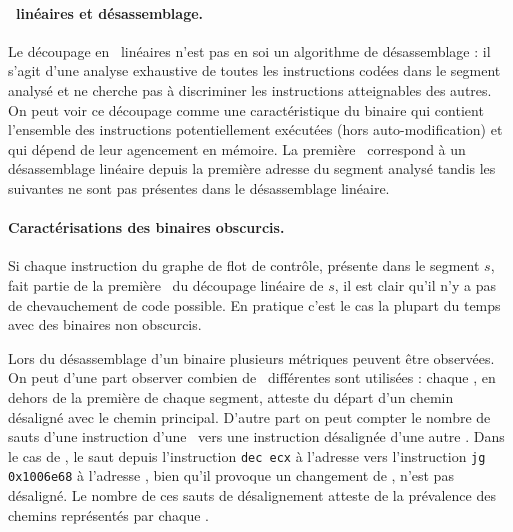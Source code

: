 \paragraph{\Layers\ linéaires et désassemblage.}
Le découpage en \layers\ linéaires n'est pas en soi un algorithme de désassemblage : il s'agit d'une analyse exhaustive de toutes les instructions codées dans le segment analysé et ne cherche pas à discriminer les instructions atteignables des autres.
On peut voir ce découpage comme une caractéristique du binaire qui contient l'ensemble des instructions potentiellement exécutées (hors auto-modification) et qui dépend de leur agencement en mémoire.
La première \layer\ correspond à un désassemblage linéaire depuis la première adresse du segment analysé tandis les suivantes ne sont pas présentes dans le désassemblage linéaire.

\paragraph{Caractérisations des binaires obscurcis.}
Si chaque instruction du graphe de flot de contrôle, présente dans le segment $s$, fait partie de la première \layer\ du découpage linéaire de $s$, il est clair qu'il n'y a pas de chevauchement de code possible.
En pratique c'est le cas la plupart du temps avec des binaires non obscurcis.

Lors du désassemblage d'un binaire plusieurs métriques peuvent être observées.
On peut d'une part observer combien de \layers\ différentes sont utilisées : chaque \layer, en dehors de la première de chaque segment, atteste du départ d'un chemin désaligné avec le chemin principal.
D'autre part on peut compter le nombre de sauts d'une instruction d'une \layer\ vers une instruction désalignée d'une autre \layer. Dans le cas de \telock, le saut depuis l'instruction \texttt{dec ecx} à l'adresse  vers l'instruction \texttt{jg 0x1006e68} à l'adresse , bien qu'il provoque un changement de \layer, n'est pas désaligné. Le nombre de ces sauts de désalignement atteste de la prévalence des chemins représentés par chaque \layer.

